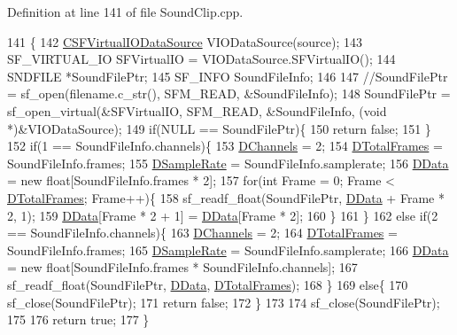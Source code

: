 Definition at line 141 of file Sound\+Clip.\+cpp.


\begin{DoxyCode}
141                                                         \{
142     \hyperlink{classCSFVirtualIODataSource}{CSFVirtualIODataSource} VIODataSource(source);
143     SF\_VIRTUAL\_IO SFVirtualIO = VIODataSource.SFVirtualIO();
144     SNDFILE *SoundFilePtr;
145     SF\_INFO SoundFileInfo;
146     
147     \textcolor{comment}{//SoundFilePtr = sf\_open(filename.c\_str(), SFM\_READ, &SoundFileInfo);}
148     SoundFilePtr = sf\_open\_virtual(&SFVirtualIO, SFM\_READ, &SoundFileInfo, (\textcolor{keywordtype}{void} *)&VIODataSource);
149     \textcolor{keywordflow}{if}(NULL == SoundFilePtr)\{
150         \textcolor{keywordflow}{return} \textcolor{keyword}{false};
151     \}
152     \textcolor{keywordflow}{if}(1 == SoundFileInfo.channels)\{
153         \hyperlink{classCSoundClip_a01aaf0b87b9b8226c77a6931d03d6a64}{DChannels} = 2;
154         \hyperlink{classCSoundClip_ab0d9eb261d09fa2a106658276f37285b}{DTotalFrames} = SoundFileInfo.frames;
155         \hyperlink{classCSoundClip_ac1b9306140da2f89f6178833e0a9b887}{DSampleRate} = SoundFileInfo.samplerate;
156         \hyperlink{classCSoundClip_a220921a0c81e5c63e2cd3c55c75878b1}{DData} = \textcolor{keyword}{new} \textcolor{keywordtype}{float}[SoundFileInfo.frames * 2];
157         \textcolor{keywordflow}{for}(\textcolor{keywordtype}{int} Frame = 0; Frame < \hyperlink{classCSoundClip_ab0d9eb261d09fa2a106658276f37285b}{DTotalFrames}; Frame++)\{
158             sf\_readf\_float(SoundFilePtr, \hyperlink{classCSoundClip_a220921a0c81e5c63e2cd3c55c75878b1}{DData} + Frame * 2, 1);   
159             \hyperlink{classCSoundClip_a220921a0c81e5c63e2cd3c55c75878b1}{DData}[Frame * 2 + 1] = \hyperlink{classCSoundClip_a220921a0c81e5c63e2cd3c55c75878b1}{DData}[Frame * 2];
160         \}
161     \}
162     \textcolor{keywordflow}{else} \textcolor{keywordflow}{if}(2 == SoundFileInfo.channels)\{
163         \hyperlink{classCSoundClip_a01aaf0b87b9b8226c77a6931d03d6a64}{DChannels} = 2;
164         \hyperlink{classCSoundClip_ab0d9eb261d09fa2a106658276f37285b}{DTotalFrames} = SoundFileInfo.frames;
165         \hyperlink{classCSoundClip_ac1b9306140da2f89f6178833e0a9b887}{DSampleRate} = SoundFileInfo.samplerate;
166         \hyperlink{classCSoundClip_a220921a0c81e5c63e2cd3c55c75878b1}{DData} = \textcolor{keyword}{new} \textcolor{keywordtype}{float}[SoundFileInfo.frames * SoundFileInfo.channels];
167         sf\_readf\_float(SoundFilePtr, \hyperlink{classCSoundClip_a220921a0c81e5c63e2cd3c55c75878b1}{DData}, \hyperlink{classCSoundClip_ab0d9eb261d09fa2a106658276f37285b}{DTotalFrames});
168     \}
169     \textcolor{keywordflow}{else}\{
170         sf\_close(SoundFilePtr);
171         \textcolor{keywordflow}{return} \textcolor{keyword}{false};    
172     \}
173     
174     sf\_close(SoundFilePtr);
175     
176     \textcolor{keywordflow}{return} \textcolor{keyword}{true};
177 \}
\end{DoxyCode}
